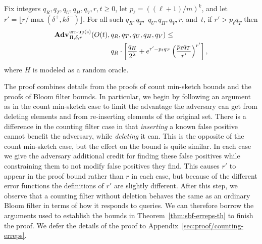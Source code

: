 \begin{theorem}\label{thm:counting-erreps}
Fix integers $q_R,q_T,q_U,q_H,q_V, r, t \geq 0$, let $p_\ell = ((\ell+1)/m)^k$,
and let
$r' = \lfloor r/\max(\delta^+,k\delta^-) \rfloor$. For all such
$q_R,q_T,$ $q_U,q_H,q_V,r$, and~$t$, if $r' > p_\ell q_T$ then
  \begin{equation*}
  \begin{aligned}
   \Adv{\erreps}_{\Pi,\delta,r}(O(t),\,&q_R,q_T,q_U,q_H,q_V) \leq\\
     & q_R \cdot \left[\frac{q_H}{2^\lambda} + e^{r'-p_\ell q_T}\left(\frac{p_\ell q_T}{r'}\right)^{r'}\right],
  \end{aligned}
\end{equation*}
where $H$ is modeled as a random oracle.
\end{theorem}
The proof combines details from the proofs of count min-sketch bounds and the
proofs of Bloom filter bounds. In particular, we begin by following an argument
as in the count min-sketch case to limit the advantage the adversary can get
from deleting elements and from re-inserting elements of the original set. There
is a difference in the counting filter case in that \emph{inserting} a known
false positive cannot benefit the adversary, while \emph{deleting} it can. This
is the opposite of the count min-sketch case, but the effect on the bound is
quite similar. In each case we give the adversary additional credit for finding
these false positives while constraining them to not modify false positives they
find. This causes $r'$ to appear in the proof bound rather than $r$ in each
case, but because of the different error functions the definitions of $r'$ are
slightly different.
%
After this step, we observe that a counting filter without
deletion behaves the same as an ordinary Bloom filter in terms of how it
responds to queries. We can therefore borrow the arguments used to establish the
bounds in Theorem~\ref{thm:sbf-erreps-th} to finish the proof.
%
We defer the details of the proof to Appendix~\ref{sec:proof/counting-erreps}.
%  

